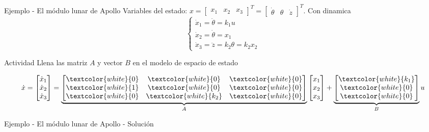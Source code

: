 \documentclass[presentation,aspectratio=1610]{beamer}
\begin{document}
\begin{frame}[label={sec:orgd55f7a8}]{Ejemplo - El módulo lunar de Apollo}
Variables del estado: \(x = \begin{bmatrix} x_1 & x_2 & x_3 \end{bmatrix}^T = \begin{bmatrix} \dot{\theta} & \theta & \dot{z} \end{bmatrix}^T\). Con dinamica
\[ \begin{cases} \dot{x}_1 =  \ddot{\theta} = k_1 u\\ \dot{x}_2 = \dot{\theta} = x_1\\ \dot{x}_3 = \ddot{z} = k_2\theta = k_2x_2 \end{cases} \]

\alert{Actividad} Llena las matriz \(A\) y vector \(B\) en el modelo de espacio de estado

\[ \dot{x} = \begin{bmatrix} \dot{x}_1\\\dot{x}_2\\\dot{x}_3\end{bmatrix} = \underbrace{\begin{bmatrix} \textcolor{white}{0} & \textcolor{white}{0} &\textcolor{white}{0} \\\textcolor{white}{1} & \textcolor{white}{0}& \textcolor{white}{0}\\ \textcolor{white}{0}& \textcolor{white}{k_2} &\textcolor{white}{0} \end{bmatrix}}_{A} \begin{bmatrix} x_1\\x_2\\x_3\end{bmatrix} + \underbrace{\begin{bmatrix} \textcolor{white}{k_1} \\ \textcolor{white}{0} \\\textcolor{white}{0}  \end{bmatrix}}_{B} u \]
\end{frame}

\begin{frame}[label={sec:org79e4302}]{Ejemplo - El módulo lunar de Apollo - Solución}
\end{frame}
\end{document}
